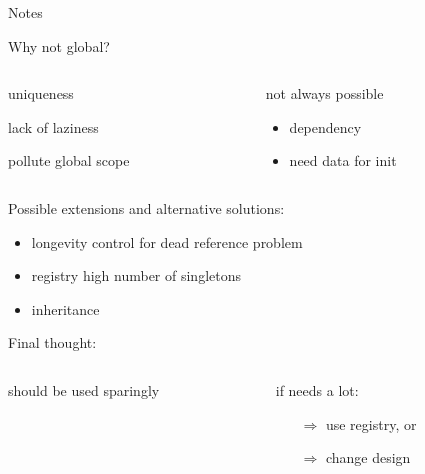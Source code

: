 \documentclass{beamer}
\begin{document}
\begin{frame}{Notes}
\begin{block}{Why not global?}
  \vspace{-0.4cm}
  \begin{itemize}
      \begin{columns}
        \begin{column}{.3\textwidth}
          \item uniqueness
          \item lack of laziness
          \item pollute global scope
        \end{column}
        \begin{column}{.45\textwidth}
        \item not always possible
          \begin{itemize}
            \item dependency
            \item need data for init
          \end{itemize}
        \end{column}
      \end{columns}
  \end{itemize}
\end{block}

\pause

\begin{block}{Possible extensions and alternative solutions:}
  \begin{itemize}
    \item longevity control for dead reference problem
    \item registry high number of singletons
    \item inheritance
  \end{itemize}
\end{block}

\pause

\begin{block}{Final thought:}
  \vspace{-0.4cm}
  \begin{itemize}
      \begin{columns}
        \begin{column}{.4\textwidth}
          \item should be used sparingly
        \end{column}
        \begin{column}{.4\textwidth}
        \item if needs a lot:
          \begin{itemize}
            \item[$\Rightarrow$] use registry, or
            \item[$\Rightarrow$] change design
          \end{itemize}
        \end{column}
      \end{columns}
  \end{itemize}
\end{block}
\end{frame}
\end{document}
